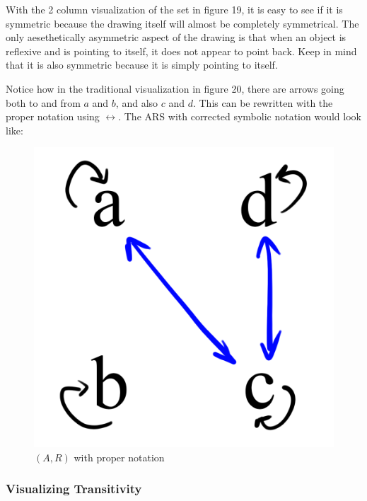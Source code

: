 \documentclass{article}
\begin{document}
\medskip\noindent
With the 2 column visualization of the set in figure 19, it is easy to see if it is symmetric because the drawing itself will almost be completely symmetrical. The only aesethetically asymmetric aspect of the drawing is that when an object is reflexive and is pointing to itself, it does not appear to point back. Keep in mind that it is also symmetric because it is simply pointing to itself.

\medskip\noindent
Notice how in the traditional visualization in figure 20, there are arrows going both to and from $a$ and $b$, and also $c$ and $d$. This can be rewritten with the proper notation using $\longleftrightarrow$. The ARS with corrected symbolic notation would look like:

\begin{figure}[H]
  \centering
  \includegraphics[scale=0.06]{v3}
  \caption[] {
    $(A, R)$ with proper notation
    \endtabular}
\end{figure}

\subsubsection{Visualizing Transitivity}
\end{document}
